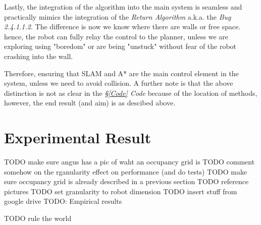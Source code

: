 \documentclass[11pt, a4paper]{article}
\begin{document}
Lastly, the integration of the algorithm into the main system is seamless and practically mimics the integration of the \textit{Return Algorithm}\cite{task2_report} a.k.a. the \textit{Bug 2.4.1.1.2}. The difference is now we know where there are walls or free space. hence, the robot can fully relay the control to the planner, unless we are exploring using "boredom"\cite{task2_report} or are being "unstuck"\cite{task2_report} without fear of the robot crashing into the wall. 

Therefore, ensuring that SLAM and A* are the main control element in the system, unless we need to avoid collision. A further note is that the above distinction is not as clear in the \textit{\S\ref{Code} Code} because of the location of methods, however, the end result (and aim) is as descibed above.


\section{Experimental Result}
\label{Experimental_Results}







TODO make sure angus has a pic of waht an occupancy grid is
TODO comment somehow on the rganularity effect on performance (and do tests)
TODO make sure occupancy grid is already described in a previous section
TODO reference pictures
TODO set granularity to robot dimension
TODO insert stuff from google drive
TODO: Empirical results


TODO rule the world
\end{document}
